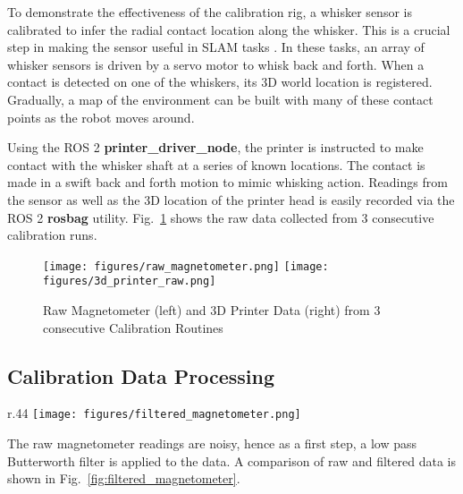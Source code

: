 \documentclass[runningheads]{llncs}
\begin{document}
To demonstrate the effectiveness of the calibration rig, a whisker sensor is calibrated to infer the radial contact location along the whisker. This is a crucial step in making the sensor useful in SLAM tasks \cite{pearsonSimultaneousLocalisationMapping2013, leporaNaiveBayesNovelty2010}. In these tasks, an array of whisker sensors is driven by a servo motor to whisk back and forth. When a contact is detected on one of the whiskers, its 3D world location is registered. Gradually, a map of the environment can be built with many of these contact points as the robot moves around.

Using the ROS 2 \textbf{printer\_driver\_node}, the printer is instructed to make contact with the whisker shaft at a series of known locations. The contact is made in a swift back and forth motion to mimic whisking action. Readings from the sensor as well as the 3D location of the printer head is easily recorded via the ROS 2 \textbf{rosbag} utility. Fig.~\ref{fig:calibration_routine} shows the raw data collected from 3 consecutive calibration runs.

\begin{figure}
    \centering
    \texttt{[image: figures/raw\_magnetometer.png]}
    \hspace{10pt}
    \texttt{[image: figures/3d\_printer\_raw.png]}
    \caption{Raw Magnetometer (left) and 3D Printer Data (right) from 3 consecutive Calibration Routines}
    \label{fig:calibration_routine}
\end{figure}

\vspace{-10pt}

\subsection{Calibration Data Processing}\label{sec:calibration_data_analysis}

\begin{wrapfigure}{r}{.44\textwidth}
    \centering
    \texttt{[image: figures/filtered\_magnetometer.png]}
    \caption{Raw and Filtered Magnetometer Reading in the X Axis }
    \label{fig:filtered_magnetometer}
\end{wrapfigure}

The raw magnetometer readings are noisy, hence as a first step, a low pass Butterworth filter is applied to the data. A comparison of raw and filtered data is shown in Fig.~\ref{fig:filtered_magnetometer}.
\end{document}
